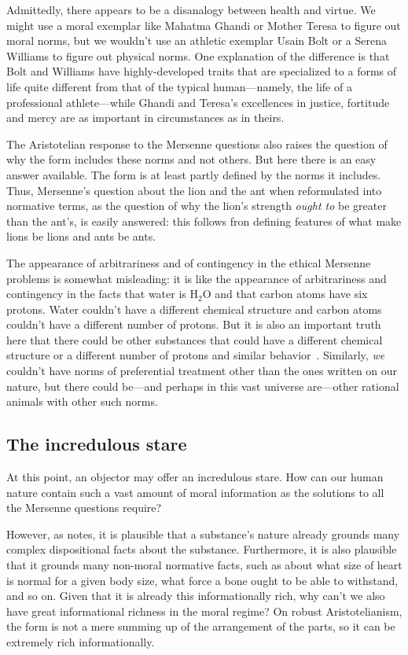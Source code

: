 Admittedly, there appears to be a disanalogy between health and virtue. We might use a moral exemplar 
like  Mahatma Ghandi or Mother Teresa to 
figure out moral norms, but we wouldn't use an athletic exemplar Usain Bolt or a Serena Williams to figure out physical norms. One explanation 
of the difference is that Bolt and Williams have highly-developed traits that are specialized to a forms of life quite
different from that of the typical human---namely, the life of a professional athlete---while Ghandi and Teresa's excellences in justice, fortitude and mercy are as important in circumstances as in theirs. 

The Aristotelian response to the Mersenne questions also raises the question of why the form includes these norms and not others. But here there is an easy 
answer available. The form is at least partly defined by the norms it includes. Thus, Mersenne's question about the lion and
the ant when reformulated into normative terms, as the question of why the lion's strength \textit{ought to} be greater
than the ant's, is easily answered: this follows fron defining features of what make lions be lions and ants be ants. 

The appearance of arbitrariness and of contingency in the ethical Mersenne problems is somewhat misleading: it is like the appearance of arbitrariness and
contingency in the facts that water is H$_2$O and that carbon atoms have six protons. Water couldn't have a different chemical
structure and carbon atoms couldn't have a different number of protons. But it is also an important truth  here that there 
could be other substances that could have a different chemical structure or a different number of protons and similar behavior~\parencite[Lecture~III]{KripkeNamNec1980}. Similarly, \textit{we}
couldn't have norms of preferential treatment other than the ones written on our nature, but there could be---and perhaps in
this vast universe are---other rational animals with other such norms.

\subsection{The incredulous stare}
At this point, an objector may offer an incredulous stare. How can our human nature contain such a vast amount of 
moral information as the solutions to all the Mersenne questions require? 

However, as  notes, it is plausible that a substance's nature already grounds many complex dispositional facts about the substance. Furthermore, it is also plausible that it grounds many non-moral normative facts,
such as about what size of heart is normal for a given body size, what force a bone ought to be able to withstand, and so on. Given that it is already this informationally rich, why can't we also have great informational richness in the moral regime? On robust Aristotelianism, the form is not a mere summing up of the arrangement of the parts, so it can be
extremely rich informationally.

